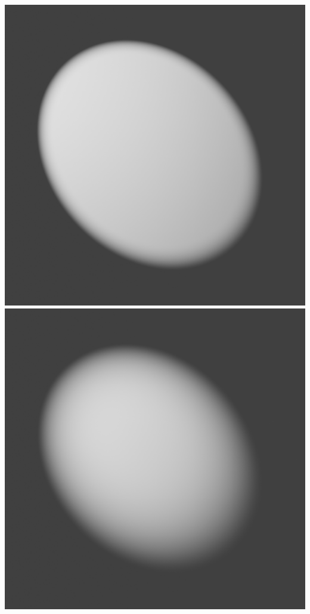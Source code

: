 \documentclass[11pt,class=report,crop=false]{standalone}
\begin{document}
\begin{center}
	\includegraphics[scale=\myscale,scale=0.1]{figures/spot-03}\quad
	\includegraphics[scale=\myscale,scale=0.1]{figures/spot-04}		
\end{center}
\end{document}
